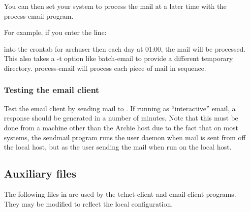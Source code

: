 You can then set your system to process the mail at a later time with the
process-email program.

\noindent For example, if you enter the line:






into the crontab for archuser then each day at 01:00, the mail will be
processed. This also takes a -t option like batch-email to provide a different
temporary directory. process-email will process each piece of mail in
sequence.

\subsubsection{Testing the email client}

Test the email client by sending mail to .  If
running as ``interactive'' email, a response should be generated in a number
of minutes. Note that this must be done from a machine other than the Archie
host due to the fact that on most systems, the sendmail program runs the user
daemon when mail is sent from off the local host, but as the user sending the
mail when run on the local host.





\subsection{Auxiliary files}

The following files in  are used by the telnet-client and
email-client programs. They may be modified to reflect the local
configuration.


